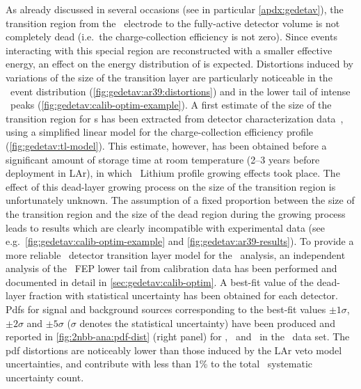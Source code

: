 \begin{description}[wide]
  \item[Transition layer model] As already discussed in several occasions (see in
    particular \cref{apdx:gedetav}), the transition region from the \nplus\ electrode to
    the fully-active detector volume is not completely dead (i.e.~the charge-collection
    efficiency is not zero). Since events interacting with this special region are
    reconstructed with a smaller effective energy, an effect on the energy distribution of
    is expected. Distortions induced by variations of the size of the transition layer are
    particularly noticeable in the \Arl\ event distribution
    (\cref{fig:gedetav:ar39:distortions}) and in the lower tail of intense \g\ peaks
    (\cref{fig:gedetav:calib-optim-example}). A first estimate of the size of the
    transition region for \bege{}s has been extracted from detector characterization
    data~\cite{Lehnert2016}, using a simplified linear model for the charge-collection
    efficiency profile (\cref{fig:gedetav:tl-model}). This estimate, however, has been
    obtained before a significant amount of storage time at room temperature (2--3 years
    before deployment in LAr), in which \nplus\ Lithium profile growing effects took
    place. The effect of this dead-layer growing process on the size of the transition
    region is unfortunately unknown. The assumption of a fixed proportion between the size
    of the transition region and the size of the dead region during the growing process
    leads to results which are clearly incompatible with experimental data (see
    e.g.~\cref{fig:gedetav:calib-optim-example} and \cref{fig:gedetav:ar39-results}).
    \newpar
    To provide a more reliable \bege\ detector transition layer model for the \nnbb\
    analysis, an independent analysis of the \Th\ FEP lower tail from calibration data has
    been performed and documented in detail in \cref{sec:gedetav:calib-optim}. A best-fit
    value of the dead-layer fraction with statistical uncertainty has been obtained for
    each detector. Pdfs for signal and background sources corresponding to the best-fit
    values $\pm1\sigma$, $\pm2\sigma$ and $\pm5\sigma$ ($\sigma$ denotes the statistical
    uncertainty) have been produced and reported in \cref{fig:2nbb-ana:pdf-dist} (right
    panel) for \kvn, \kvz\ and \nnbb\ in the \enrBEGeII\ data set. The pdf distortions are
    noticeably lower than those induced by the LAr veto model uncertainties, and
    contribute with less than 1\% to the total \thalftwo\ systematic uncertainty count.


\end{description}
